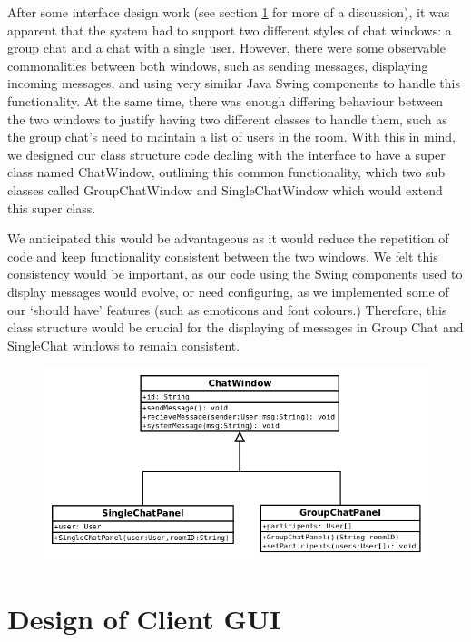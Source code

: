 After some interface design work (see section \ref{gui_design} for more of a discussion), it was apparent that the system had to support two different styles of chat windows: a group chat and a chat with a single user. However, there were some observable commonalities between both windows, such as sending messages, displaying incoming messages, and using very similar Java Swing components to handle this functionality. At the same time, there was enough differing behaviour between the two windows to justify having two different classes to handle them, such as the group chat's need to maintain a list of users in the room. With this in mind, we designed our class structure code dealing with the interface to have a super class named ChatWindow, outlining this common functionality, which two sub classes called GroupChatWindow and SingleChatWindow which would extend this super class. 

We anticipated this would be advantageous as it would reduce the repetition of code and keep functionality consistent between the two windows. We felt this consistency would be important, as our code using the Swing components used to display messages would evolve, or need configuring, as we implemented some of our `should have' features (such as emoticons and font colours.) Therefore, this class structure would be crucial for the displaying of messages in Group Chat and SingleChat windows to remain consistent.

\begin{figure}
    \begin{center}
        \includegraphics[scale=0.65]{Design/diagrams/chatwin.png}
        \label{chatwin}
    \end{center}
\end{figure}

\section{Design of Client GUI}
\label{gui_design}

